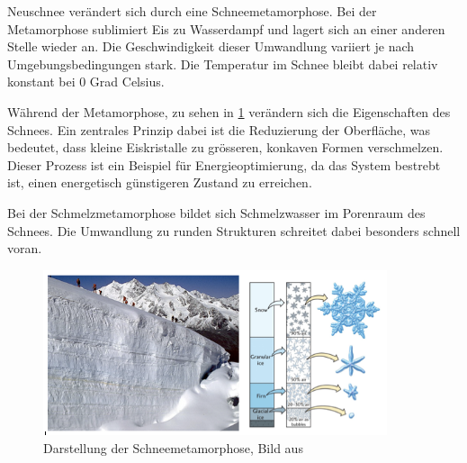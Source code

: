 Neuschnee verändert sich durch eine Schneemetamorphose. Bei der Metamorphose sublimiert Eis zu Wasserdampf und lagert sich an einer anderen Stelle wieder an. Die Geschwindigkeit dieser Umwandlung variiert je nach Umgebungsbedingungen stark. Die Temperatur im Schnee bleibt dabei relativ konstant bei 0 Grad Celsius.


Während der Metamorphose, zu sehen in \ref{fig:Metha} verändern sich die Eigenschaften des Schnees. Ein zentrales Prinzip dabei ist die Reduzierung der Oberfläche, was bedeutet, dass kleine Eiskristalle zu grösseren, konkaven Formen verschmelzen. Dieser Prozess ist ein Beispiel für Energieoptimierung, da das System bestrebt ist, einen energetisch günstigeren Zustand zu erreichen.

Bei der Schmelzmetamorphose bildet sich Schmelzwasser im Porenraum des Schnees. Die Umwandlung zu runden Strukturen schreitet dabei besonders schnell voran. \cite{WSLSLFMetha.2024}

\begin{figure}[H]
    \centering
    \includegraphics[width=0.9\textwidth]{Bilder/gletscher_eis_schnee.png}
    \caption{Darstellung der Schneemetamorphose, Bild aus \cite{Wetterdienst.6222017}}
    \label{fig:Metha}
\end{figure}
